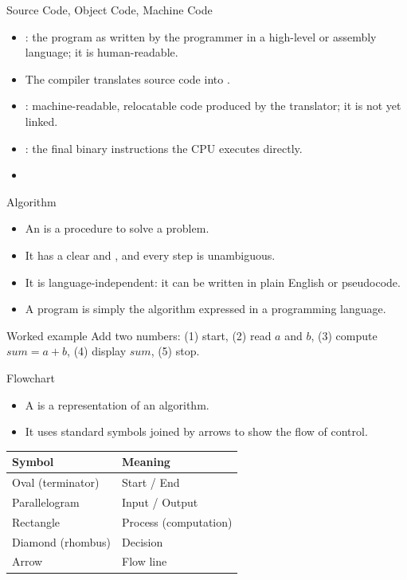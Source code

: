 \documentclass[aspectratio=169]{beamer}
\begin{document}
\begin{frame}{Source Code, Object Code, Machine Code}
  \begin{itemize}
    \item {}: the program as written by the programmer in a
      high-level or assembly language; it is human-readable.
    \item The compiler translates source code into .
    \item {}: machine-readable, relocatable code produced by
      the translator; it is not yet linked.
    \item {}: the final binary instructions the CPU
      executes directly.
    \item {}
  \end{itemize}
\end{frame}

\begin{frame}{Algorithm}
  \begin{itemize}
    \item An  is a  procedure to
      solve a problem.
    \item It has a clear  and , and every step is
      unambiguous.
    \item It is language-independent: it can be written in plain English or
      pseudocode.
    \item A program is simply the algorithm expressed in a programming
      language.
  \end{itemize}
  \begin{exampleblock}{Worked example}
    Add two numbers: (1) start, (2) read $a$ and $b$, (3) compute
    $sum = a + b$, (4) display $sum$, (5) stop.
  \end{exampleblock}
\end{frame}

\begin{frame}{Flowchart}
  \begin{itemize}
    \item A  is a  representation of an
      algorithm.
    \item It uses standard symbols joined by arrows to show the flow of
      control.
  \end{itemize}
  \begin{center}
    \begin{tabular}{p{}p{}}
      \toprule
      \textbf{Symbol} & \textbf{Meaning} \\
      \midrule
      Oval (terminator) & Start / End \\
      Parallelogram & Input / Output \\
      Rectangle & Process (computation) \\
      Diamond (rhombus) & Decision \\
      Arrow & Flow line \\
      \bottomrule
    \end{tabular}
  \end{center}
\end{frame}
\end{document}
